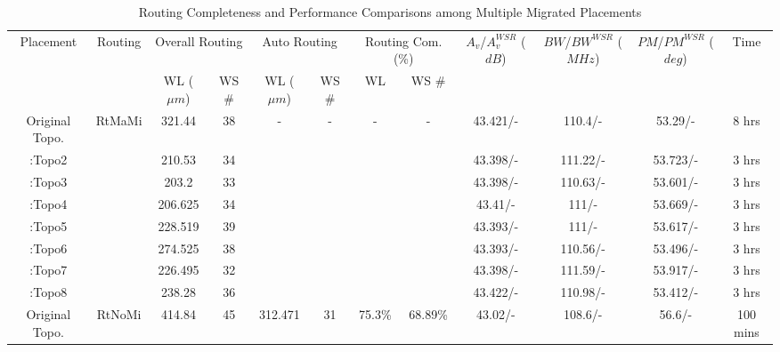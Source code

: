       \begin{table}
        \scriptsize
        \begin{center}
          \caption{Routing Completeness and Performance Comparisons among Multiple Migrated Placements}\label{table:MultProto}
          \begin{tabular}{|c|c|c|c|c|c|c|c|c|c|c|c|}
            \toprule
            \hline
            \multirow{2}{*}{Placement}& 
            \multirow{2}{*}{Routing} & 
            \multicolumn{2}{c|}{Overall Routing}  & 
            \multicolumn{2}{c|}{Auto Routing } & 
            \multicolumn{2}{c|}{Routing Com. (\%)} & 
            \multirow{2}{1cm}{\scriptsize $A_v$/$A_v^{WSR}$ ($dB$)} & 
            \multirow{2}{1.3cm}{\tiny $BW$/$BW^{WSR}$ ($MHz$)} & 
            \multirow{2}{1.3cm}{\tiny $PM$/$PM^{WSR}$ ($deg$)} & 
            \multirow{2}{*}{Time}\\
            \cline{3-8} 
            & & WL ($\mu m$) & WS \#  &  WL ($\mu m$) & WS \# &  WL & WS \# & & & & \\
            \hline
              Original Topo. & \multirow{8}{*}{RtMaMi} & 321.44 & 38 &\multirow{8}{*}{-} & \multirow{8}{*}{-} & \multirow{8}{*}{-} & \multirow{8}{*}{-} & 43.421/- & 110.4/- & 53.29/- & 8 hrs \\ \cline{1-1} \cline{3-4} \cline{9-12}
              \cite{ALP_YPWeng_iccad2011}:Topo2 & & 210.53 & 34 & & & & & 43.398/- & 111.22/- & 53.723/- & 3 hrs \\ 
              \cite{ALP_YPWeng_iccad2011}:Topo3 & & 203.2 & 33 & & & & & 43.398/- & 110.63/- & 53.601/- & 3 hrs \\ 
              \cite{ALP_YPWeng_iccad2011}:Topo4 & & 206.625 & 34 & & & & & 43.41/- & 111/- & 53.669/- & 3 hrs \\ 
              \cite{ALP_YPWeng_iccad2011}:Topo5 & & 228.519 & 39 & & & & & 43.393/- & 111/- & 53.617/- & 3 hrs \\ 
              \cite{ALP_YPWeng_iccad2011}:Topo6 & & 274.525 & 38 & & & & & 43.393/- & 110.56/- & 53.496/- & 3 hrs \\ 
              \cite{ALP_YPWeng_iccad2011}:Topo7 & & 226.495 & 32 & & & & & 43.398/- & 111.59/- & 53.917/- & 3 hrs \\ 
              \cite{ALP_YPWeng_iccad2011}:Topo8 & & 238.28 & 36 & & & & & 43.422/- & 110.98/- & 53.412/- & 3 hrs \\
            \hline
              Original Topo. & \multirow{8}{*}{RtNoMi} & 414.84 & 45 & 312.471 & 31 & 75.3\% & 68.89\% & 43.02/- & 108.6/- & 56.6/- & 100 mins \\ \cline{1-1} \cline{3-12}

\end{tabular}
\end{center}
\end{table}

